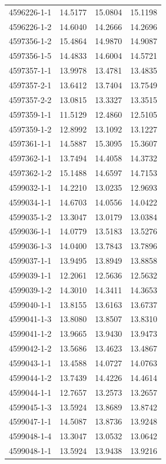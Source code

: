 \begin{longtable}{lrrr}
4596226-1-1 & 14.5177 & 15.0804 & 15.1198 \\
4596226-1-2 & 14.6040 & 14.2666 & 14.2696 \\
4597356-1-2 & 15.4864 & 14.9870 & 14.9087 \\
4597356-1-5 & 14.4833 & 14.6004 & 14.5721 \\
4597357-1-1 & 13.9978 & 13.4781 & 13.4835 \\
4597357-2-1 & 13.6412 & 13.7404 & 13.7549 \\
4597357-2-2 & 13.0815 & 13.3327 & 13.3515 \\
4597359-1-1 & 11.5129 & 12.4860 & 12.5105 \\
4597359-1-2 & 12.8992 & 13.1092 & 13.1227 \\
4597361-1-1 & 14.5887 & 15.3095 & 15.3607 \\
4597362-1-1 & 13.7494 & 14.4058 & 14.3732 \\
4597362-1-2 & 15.1488 & 14.6597 & 14.7153 \\
4599032-1-1 & 14.2210 & 13.0235 & 12.9693 \\
4599034-1-1 & 14.6703 & 14.0556 & 14.0422 \\
4599035-1-2 & 13.3047 & 13.0179 & 13.0384 \\
4599036-1-1 & 14.0779 & 13.5183 & 13.5276 \\
4599036-1-3 & 14.0400 & 13.7843 & 13.7896 \\
4599037-1-1 & 13.9495 & 13.8949 & 13.8858 \\
4599039-1-1 & 12.2061 & 12.5636 & 12.5632 \\
4599039-1-2 & 14.3010 & 14.3411 & 14.3653 \\
4599040-1-1 & 13.8155 & 13.6163 & 13.6737 \\
4599041-1-3 & 13.8080 & 13.8507 & 13.8310 \\
4599041-1-2 & 13.9665 & 13.9430 & 13.9473 \\
4599042-1-2 & 13.5686 & 13.4623 & 13.4867 \\
4599043-1-1 & 13.4588 & 14.0727 & 14.0763 \\
4599044-1-2 & 13.7439 & 14.4226 & 14.4614 \\
4599044-1-1 & 12.7657 & 13.2573 & 13.2657 \\
4599045-1-3 & 13.5924 & 13.8689 & 13.8742 \\
4599047-1-1 & 14.5087 & 13.8736 & 13.9248 \\
4599048-1-4 & 13.3047 & 13.0532 & 13.0642 \\
4599048-1-1 & 13.5924 & 13.9438 & 13.9216 \\

\end{longtable}
